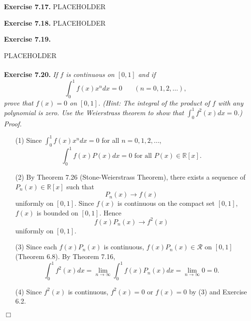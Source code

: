\documentclass{article}
\begin{document}



\textbf{Exercise 7.17.}
PLACEHOLDER






\textbf{Exercise 7.18.}
PLACEHOLDER






\textbf{Exercise 7.19.}

PLACEHOLDER \\\\






\textbf{Exercise 7.20.}
\emph{If $f$ is continuous on $[0,1]$ and if
\[
  \int_{0}^{1} f(x) x^n dx = 0
  \:\:\:\:\:\:\:\:
  (n=0,1,2,\ldots),
\]
prove that $f(x) = 0$ on $[0,1]$.
(Hint: The integral of the product of $f$ with any polynomial is zero.
Use the Weierstrass theorem to show that
$\int_{0}^{1} f^2(x) dx = 0$.)} \\

\emph{Proof.}
\begin{enumerate}
\item[(1)]
Since $\int_{0}^{1} f(x) x^n dx = 0$ for all $n = 0,1,2,\ldots$,
\[
  \int_{0}^{1} f(x) P(x) dx = 0 \text{ for all } P(x) \in \mathbb{R}[x].
\]

\item[(2)]
By Theorem 7.26 (Stone-Weierstrass Theorem),
there exists a sequence of $P_n(x) \in \mathbb{R}[x]$ such that
\[
  P_n(x) \to f(x)
\]
uniformly on $[0,1]$.
Since $f(x)$ is continuous on the compact set $[0,1]$, $f(x)$ is bounded on $[0,1]$.
Hence
\[
  f(x) P_n(x) \to f^2(x)
\]
uniformly on $[0,1]$.

\item[(3)]
Since each $f(x) P_n(x)$ is continuous,
$f(x) P_n(x) \in \mathscr{R}$ on $[0,1]$ (Theorem 6.8).
By Theorem 7.16,
\[
  \int_{0}^{1} f^2(x) dx
  = \lim_{n \to \infty} \int_{0}^{1} f(x) P_n(x) dx
  = \lim_{n \to \infty} 0
  = 0.
\]

\item[(4)]
Since $f^2(x)$ is continuous,
$f^2(x) = 0$ or $f(x) = 0$ by (3) and Exercise 6.2.
\end{enumerate}
$\Box$ \\\\
\end{document}
